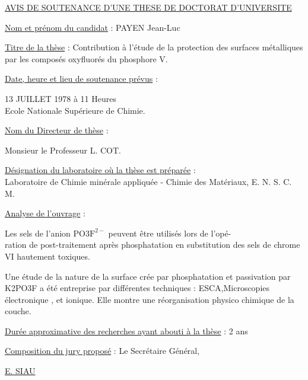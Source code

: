 \uline{AVIS DE SOUTENANCE D'UNE THESE DE DOCTORAT D'UNIVERSITE}

\uline{Nom et prénom du candidat} : PAYEN Jean-Luc

\uline{Titre de la thèse} : Contribution à l'étude de la protection des surfaces métalliques par les composés oxyfluorés du phosphore V.

\uline{Date, heure et lieu de soutenance prévus} :

13 JUILLET 1978 à 11 Heures\\
Ecole Nationale Supérieure de Chimie.

\uline{Nom du Directeur de thèse} :

Monsieur le Professeur L. COT.

\uline{Désignation du laboratoire où la thèse est préparée} :\\
Laboratoire de Chimie minérale appliquée - Chimie des Matériaux, E. N. S. C. M.

\uline{Analyse de l'ouvrage} :

Les sels de l'anion $\mathrm{PO3F}^{2-}$ peuvent être utilisés lors de l'opé-\\
ration de post-traitement après phosphatation en substitution des sels de chrome VI hautement toxiques.

Une étude de la nature de la surface crée par phosphatation et passivation par K2PO3F a été entreprise par différentes techniques : ESCA,Microscopies électronique , et ionique. Elle montre une réorganisation physico chimique de la couche.

\uline{Durée approximative des recherches ayant abouti à la thèse} : 2 ans

\uline{Composition du jury proposé} :
Le Secrétaire Général,


\uline{E. SIAU}
